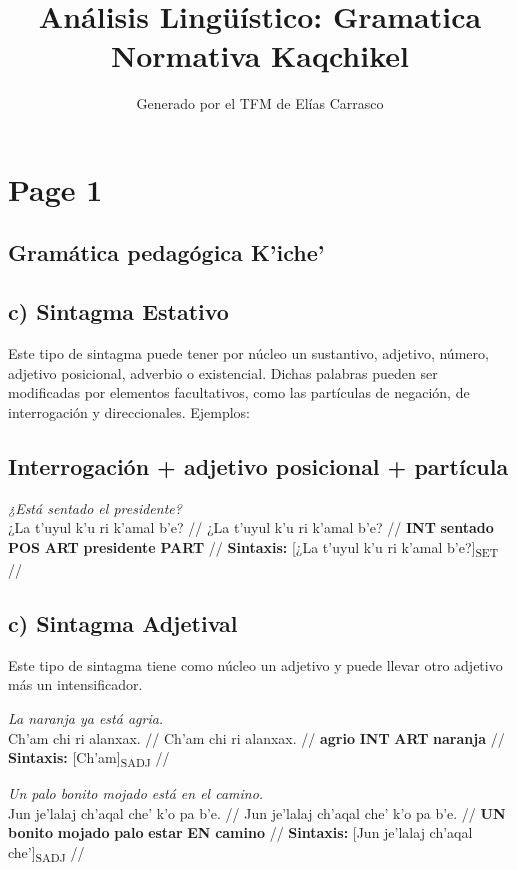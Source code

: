 \documentclass{article}%
\title{Análisis Lingüístico: Gramatica Normativa Kaqchikel}%
\author{Generado por el TFM de Elías Carrasco}%
\begin{document}
%
\normalsize%
\maketitle%
\section{Page 1}%
\label{sec:Page1}%
\subsection{Gramática pedagógica K'iche'}%
\label{subsec:GramticapedaggicaKiche}%

%
\subsection{c) Sintagma Estativo}%
\label{subsec:c)SintagmaEstativo}%

%
Este tipo de sintagma puede tener por núcleo un sustantivo, adjetivo, número, adjetivo %
posicional, adverbio o existencial. Dichas palabras pueden ser modificadas por %
elementos facultativos, como las partículas de negación, de interrogación y direccionales. %
Ejemplos: %
\subsection{Interrogación + adjetivo posicional + partícula}%
\label{subsec:Interrogacin+adjetivoposicional+partcula}%

%
\par\medskip%
\ex
\textit{¿Está sentado el presidente?} \\
\begingl
\gla ¿La t’uyul k’u ri k’amal b’e? //
\glb ¿La t’uyul k’u ri k’amal b’e? //
\glc \textbf{INT} \textbf{sentado} \textbf{POS} \textbf{ART} \textbf{presidente} \textbf{PART} //
\glft \textbf{Sintaxis:} [¿La t’uyul k’u ri k’amal b’e?]\textsubscript{SET} //
\endgl
\xe
%
\medskip%
\subsection{c) Sintagma Adjetival}%
\label{subsec:c)SintagmaAdjetival}%

%
Este tipo de sintagma tiene como núcleo un adjetivo y puede llevar otro adjetivo más un %
intensificador. %
\par\medskip%
\ex
\textit{La naranja ya está agria.} \\
\begingl
\gla Ch'am chi ri alanxax. //
\glb Ch'am chi ri alanxax. //
\glc \textbf{agrio} \textbf{INT} \textbf{ART} \textbf{naranja} //
\glft \textbf{Sintaxis:} [Ch'am]\textsubscript{SADJ} //
\endgl
\xe
%
\medskip%
\par\medskip%
\ex
\textit{Un palo bonito mojado está en el camino.} \\
\begingl
\gla Jun je’lalaj ch’aqal che' k'o pa b’e. //
\glb Jun je’lalaj ch’aqal che' k'o pa b’e. //
\glc \textbf{UN} \textbf{bonito} \textbf{mojado} \textbf{palo} \textbf{estar} \textbf{EN} \textbf{camino} //
\glft \textbf{Sintaxis:} [Jun je’lalaj ch’aqal che']\textsubscript{SADJ} //
\endgl
\xe
%
\medskip%
\end{document}
